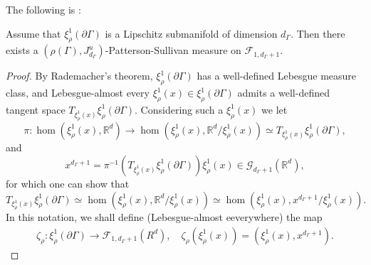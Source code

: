 \documentclass{report}
\begin{document}
The following is \cite[Proposition 6.4]{pozzetti_anosov_2023}:
\begin{proposition}\label{prop:PSMeasureExists}
Assume that $\xi^1_\rho(\partial \Gamma)$ is a Lipschitz submanifold of dimension $d_\Gamma$.
Then there exists a $(\rho(\Gamma), J_{d_\Gamma}^u)$-Patterson-Sullivan measure on $\mathcal F_{1,d_\Gamma + 1}$.
\end{proposition}
\begin{proof}
    By Rademacher's theorem, $\xi^1_\rho(\partial \Gamma)$ has a well-defined Lebesgue measure class, and Lebesgue-almost every $\xi^1_\rho(x) \in \xi^1_\rho(\partial \Gamma)$ admits a well-defined tangent space $T_{\xi^1_\rho(x)} \xi^1_\rho(\partial \Gamma)$.
    Considering such a $\xi^1_\rho(x)$ we let
    \[
        \pi : \hom(\xi^1_\rho(x), \mathbb R^d) \to \hom(\xi^1_\rho(x), \mathbb R^d/\xi^1_\rho(x)) \simeq T_{\xi^1_\rho(x)} \xi^1_\rho(\partial \Gamma),
    \]
    and
    \[
        x^{d_\Gamma + 1} = \pi^{-1} (T_{\xi^1_\rho(x)} \xi^1_\rho(\partial \Gamma)) \xi^1_\rho(x) \in 
        \mathcal G_{d_\Gamma + 1} (\mathbb R^d),
    \]
    for which one can show that
    \[
        T_{\xi^1_\rho(x)} \xi^1_\rho(\partial \Gamma) \simeq 
        \hom(\xi^1_\rho(x), \mathbb R^d / \xi^1_\rho(x)) \simeq
        \hom(\xi^1_\rho(x), x^{d_\Gamma + 1} / \xi^1_\rho(x)).
    \]
    In this notation, we shall define (Lebesgue-almost eeverywhere) the map
    \begin{align*}
        \zeta_\rho: \xi_\rho^1(\partial \Gamma) \to \mathcal F_{1, d_\Gamma + 1} (R^d), \quad 
        \zeta_\rho(\xi_\rho^1(x)) = (\xi_\rho^1(x), x^{d_\Gamma + 1}).
    \end{align*}


\end{proof}
\end{document}
